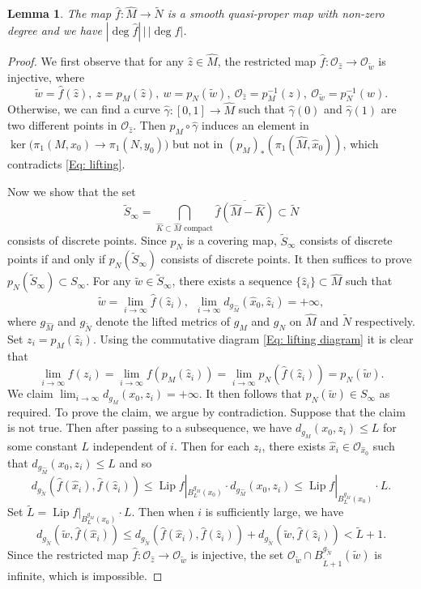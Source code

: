 \documentclass[10pt,a4paper]{amsart}
\newtheorem{lemma}{Lemma}
\DeclareMathOperator{\Lip}{Lip}
\begin{document}
\begin{lemma}\label{Lem: lifting}
The map	$\hat f:\widehat M\to \tilde N$ is a smooth quasi-proper map with non-zero degree and we have $|\deg \hat f|\,\big|\,|\deg f|$.
\end{lemma}

\begin{proof}
We first observe that for any $\hat{z}\in\widehat{M}$, the restricted map $\hat f:\mathcal O_{\hat z}\to \mathcal O_{\tilde w}$ is injective, where
\[
\tilde{w} = \hat{f}(\hat{z}), \
z = p_{M}(\hat{z}), \
w = p_{N}(\tilde{w}), \
\mathcal O_{\hat z} = p_M^{-1}(z), \
\mathcal O_{\tilde w} = p_N^{-1}(w).
\]
Otherwise, we can find a curve $\hat\gamma:[0,1] \to \widehat M$ such that $\hat\gamma(0)$ and $\hat\gamma(1)$ are two different points in $\mathcal O_{\hat z}$. Then $p_M\circ \hat\gamma$ induces an element in $\ker\big(\pi_1(M,x_0)\to \pi_1(N,y_0)\big)$ but not in $(p_M)_*(\pi_1(\widehat M,\hat x_0))$, which contradicts \eqref{Eq: lifting}.

Now we show that the set
$$
\tilde S_\infty=\bigcap_{\widehat K\subset \widehat M \text{ compact}} \overline{\hat f(\widehat M- \widehat K)} \subset \tilde N
$$
consists of discrete points. Since $p_N$ is a covering map, $\tilde S_\infty$ consists of discrete points if and only if $p_N(\tilde S_\infty)$ consists of discrete points. It then suffices to prove $p_N(\tilde S_\infty)\subset S_\infty$. For any $\tilde{w}\in\tilde S_\infty$, there exists a sequence $\{\hat{z}_{i}\}\subset\widehat{M}$ such that
\[
\tilde{w} = \lim_{i\to\infty}\hat{f}(\hat{z}_{i}), \ \
\lim_{i\to\infty}d_{g_{\widehat{M}}}(\hat{x}_{0},\hat{z}_{i}) = +\infty,
\]
where $g_{\widehat{M}}$ and $g_{\tilde{N}}$ denote the lifted metrics of $g_{M}$ and $g_{N}$ on $\widehat{M}$ and $\tilde{N}$ respectively. Set $z_{i}=p_{M}(\hat{z}_{i})$. Using the commutative diagram \eqref{Eq: lifting diagram} it is clear that
\[
\lim_{i\to\infty}f(z_{i})
= \lim_{i\to\infty}f(p_{M}(\hat{z}_{i}))
= \lim_{i\to\infty}p_{N}(\hat{f}(\hat{z}_{i}))
= p_{N}(\tilde{w}).
\]
We claim $\lim_{i\to\infty}d_{g_{M}}(x_{0},z_{i})=+\infty$. It then follows that $p_{N}(\tilde{w})\in S_\infty$ as required. To prove the claim, we argue by contradiction. Suppose that the claim is not true. Then after passing to a subsequence, we have $d_{g_{M}}(x_{0},z_{i})\leq L$ for some constant $L$ independent of $i$. Then for each $z_{i}$, there exists $\hat{x}_{i}\in\mathcal{O}_{\hat{x}_{0}}$ such that $d_{g_{\widehat{M}}}(x_{0},z_{i})\leq L$ and so
\[
d_{g_{\tilde{N}}}(\hat{f}(\hat{x}_{i}),\hat{f}(\hat{z}_{i}))
\leq \Lip f|_{B_{L}^{g_{M}}(x_{0})}\cdot d_{g_{\widehat{M}}}(x_{0},z_{i})
\leq \Lip f|_{B_{L}^{g_{M}}(x_{0})}\cdot L.
\]
Set $\tilde{L}=\Lip f|_{B_{L}^{g_{M}}(x_{0})}\cdot L$. Then when $i$ is sufficiently large, we have
\[
d_{g_{\tilde{N}}}(\tilde{w},\hat{f}(\hat{x}_{i}))
\leq d_{g_{\tilde{N}}}(\hat{f}(\hat{x}_{i}),\hat{f}(\hat{z}_{i}))+d_{g_{\tilde{N}}}(\tilde{w},\hat{f}(\hat{z}_{i}))
< \tilde{L}+1.
\]
Since the restricted map $\hat f:\mathcal O_{\hat z}\to \mathcal O_{\tilde w}$ is injective, the set $\mathcal{O}_{\tilde{w}}\cap B_{\tilde{L}+1}^{g_{\tilde{N}}}(\tilde{w})$ is infinite, which is impossible.


\end{proof}
\end{document}
